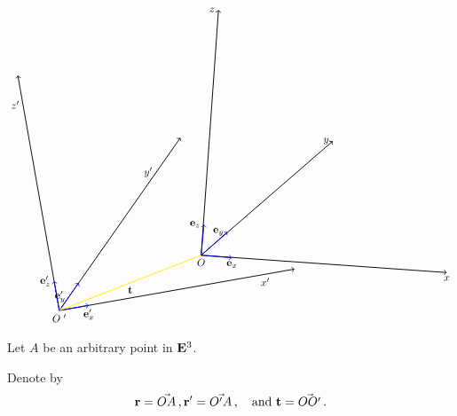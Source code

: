 \documentclass[12pt]{article}
\numberwithin{equation}{section}
\begin{document}
\begin{equation*}
\begin{tikzpicture} [rotate=10]
\draw 
[ <-> , thick] 
(8,0)--(0,0)--(0,8);
\draw 
[ -> , thick] 
(0,0)--(5,5);


\draw [thick, ->,blue] (0,0)--(1,0);
\node [below] at (1,0) {$\e'_x$};

\draw [thick, ->,blue] (0,0)--(0,1);
\node [left] at (0,1) {$\e'_z$};

\draw [thick, ->,blue] (0,0)--(0.8,0.8);
\node [left] at (0.4,0.4) {$\e'_y$};


\node [below] at (7,0) {$x'$};
\node [left] at (0,7) {$z'$};
\node [left] at (4,4) {$y'$};


\node [below] at (0,0) {$O^{\,\,\prime}$};


 
\draw 
[ <-> , thick] 
(13,-1)--(5,1)--(7,9);
\draw 
[ -> , thick] 
(5,1)--(10,4);


\draw [thick, ->,blue] (5,1)--(6,21pt);
\node [below] at (6,21pt) {$\e_x$};

\draw [thick, ->,blue] (5,1)--(150pt,2);
\node [left] at (150pt,2) {$\e_z$};

\draw [thick, ->,blue] (5,1)--(6,46pt);
\node [left] at (6,46pt) {$\e_y$};


\node [below] at (13,-1) {$x$};
\node [left] at (7,9) {$z$};
\node [left] at (10,4) {$y$};


\node [below] at (5,1) {$O$};

\draw [thick, yellow,->] (5,1)--(0,0);


\node [below] at (2.5,0.5) {$\bf t$};


\end{tikzpicture}
\end{equation*}

  Let $A$ be an arbitrary point in ${\bf E}^3$.

  Denote by
       $$
{\bf r}=\vec {OA}\,,
{\bf r}'=\vec {O'A}\,,\quad {\rm and}\,\,
{\bf t}=\vec {OO'}\,.
       $$ 
\end{document}
